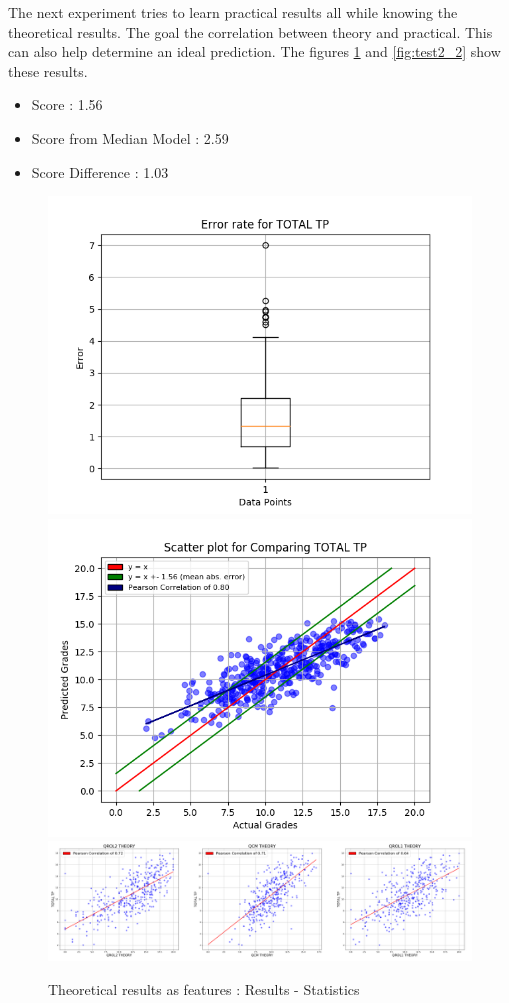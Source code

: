 \documentclass[a4paper,11pt]{report}
\numberwithin{figure}{chapter} %
\begin{document}
    The next experiment tries to learn practical results all while knowing the theoretical results.
    The goal the correlation between theory and practical.
    This can also help determine an ideal prediction.
    The figures \ref{fig:test2_1} and \ref{fig:test2_2} show these results.
    \begin{itemize}
        \item[\textbullet] Score : 1.56
        \item[\textbullet] Score from Median Model : 2.59
        \item[\textbullet] Score Difference : 1.03
    \end{itemize}
      \begin{figure}[H]
      \centering
      \includegraphics[width=.40\linewidth]{plots/test2_cv_boxplot_TOTAL_TP_2018-05-18_14_11_28.png}
      \includegraphics[width=.40\linewidth]{plots/test2_cv_comp_TOTAL_TP_2018-05-18_14_11_28.png}\\
      \includegraphics[width=.99\linewidth]{plots/test2_var_correlation_TOTAL_TP_2018-05-18_02_51_44.png}
      \caption{Theoretical results as features : Results - Statistics}
      \label{fig:test2_1}
      \end{figure}
\end{document}
